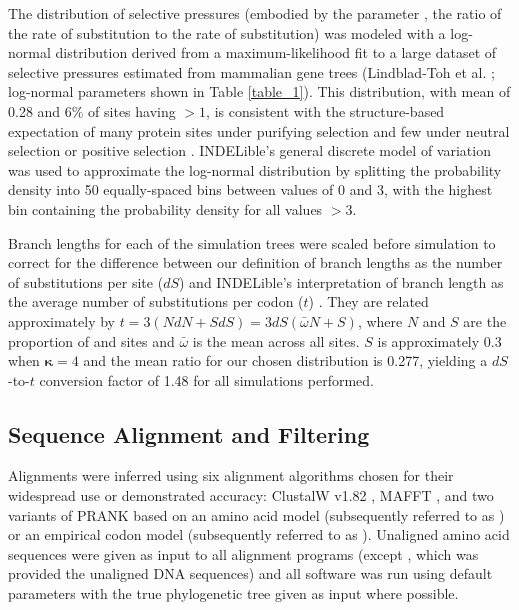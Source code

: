 The distribution of \sw selective pressures (embodied by the parameter
\omg, the ratio of the rate of \nsyn substitution to the
rate of \syn substitution) was modeled with a log-normal
distribution derived from a maximum-likelihood fit to a large dataset
of \sw selective pressures estimated from mammalian gene trees
(Lindblad-Toh et al. \citeyear{LindbladToh2011High}; log-normal parameters shown in Table
\ref{table_1}). This distribution, with mean \omg of 0.28 and 6\% of
sites having \omg$>1$, is consistent with the structure-based
expectation of many protein sites under purifying selection and few
under neutral selection or positive selection
\citep{Smith1970Natural,Kimura1974SomePrinciples}. INDELible's general
discrete model of \sw \omg variation was used to approximate the
log-normal distribution by splitting the probability density into 50
equally-spaced bins between \omg values of 0 and 3, with the highest
bin containing the probability density for all values \omg$>3$.

Branch lengths for each of the simulation trees were scaled before
simulation to correct for the difference between our definition of
branch lengths as the number of \syn substitutions per
\syn site ($dS$) and INDELible's interpretation of branch length
as the average number of substitutions per codon ($t$)
\citep{Fletcher2010Effect}. They are related approximately by
$t=3(NdN+SdS) = 3dS(\bar{\omega}N+S)$, where $N$ and $S$ are the
proportion of \nsyn and \syn sites and $\bar{\omega}$ is
the mean \omg across all sites. $S$ is approximately 0.3 when
$\bm{\kappa}=4$ \citep{Yang1998Synonymous} and the mean \omg ratio
for our chosen distribution is 0.277, yielding a $dS$-to-$t$
conversion factor of 1.48 for all simulations performed.

\subsection{Sequence Alignment and Filtering}

Alignments were inferred using six alignment algorithms chosen for
their widespread use or demonstrated accuracy: ClustalW v1.82
\citep{Thompson1994ClustalW}, MAFFT \citep{Katoh2005MAFFT},  and two variants of
PRANK \citep{Loytynoja2008PhylogenyAware} based on an amino acid model
(subsequently referred to as \pranka{}) or an empirical codon model
(subsequently referred to as \prankc{}). Unaligned amino acid
sequences were given as input to all alignment programs (except
\prankc{}, which was provided the unaligned DNA sequences) and all
software was run using default parameters with the true phylogenetic
tree given as input where possible.

